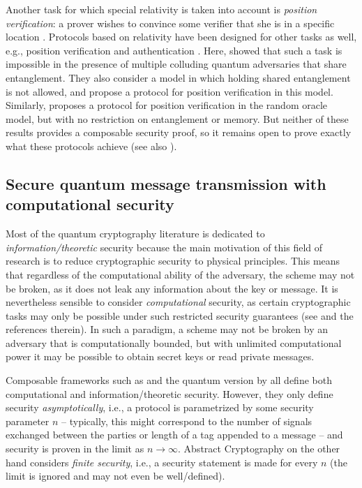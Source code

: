 Another task for which special relativity is taken into account is
\emph{position verification}: a prover wishes to convince some
verifier that she is in a specific location \cite{CGMO09}. Protocols
based on relativity have been designed for other tasks as well, e.g.,
position verification and authentication \cite{BCFGGOS14,Unr14}. Here,
\textcite{BCFGGOS14} showed that such a task is impossible in the
presence of multiple colluding quantum adversaries that share
entanglement. They also consider a model in which holding shared
entanglement is not allowed, and propose a protocol for position
verification in this model. Similarly, \cite{Unr14} proposes a
protocol for position verification in the random oracle model, but
with no restriction on entanglement or memory. But neither of these
results provides a composable security proof, so it remains open to
prove exactly what these protocols achieve (see also
).


\subsection{Secure quantum message transmission with computational security}
\label{sec:computational}

Most of the quantum cryptography literature is dedicated to
\emph{information\-/theoretic} security because the main motivation
of this field of research is to reduce cryptographic security to
physical principles. This means that regardless of the computational
ability of the adversary, the scheme may not be broken, as it does not
leak any information about the key or message. It is nevertheless
sensible to consider \emph{computational} security, as certain
cryptographic tasks may only be possible under such restricted
security guarantees (see \textcite{ABFGSSJ16} and the references
therein). In such a paradigm, a scheme may not be broken by an
adversary that is computationally bounded, but with unlimited
computational power it may be possible to obtain secret keys or read
private messages.

Composable frameworks such as \textcite{PW00,PW01,Can01} and the
quantum version by \textcite{Unr10} all define both computational and
information\-/theoretic security. However, they only define security
\emph{asymptotically}, i.e., a protocol is parametrized by some
security parameter $n$ \--- typically, this might correspond to the
number of signals exchanged between the parties or length of a tag
appended to a message \--- and security is proven in the limit as
$n \to \infty$. Abstract Cryptography \cite{MR11} on the other hand
considers \emph{finite security}, i.e., a security statement is made
for every $n$ (the limit is ignored and may not even be
well\-/defined).

